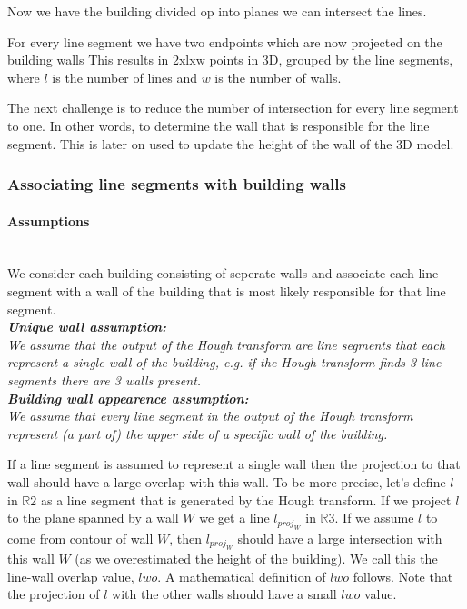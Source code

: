 	Now we have the building divided op into planes we can intersect the lines.

	For every line segment we have two endpoints which are now projected on the
	building walls
	This results in 2xlxw points in 3D, grouped by the line segments, where $l$ is the number
	of lines and $w$ is the number of walls. 

	The next challenge is to reduce the number of intersection for every line
	segment to one. In other words, to determine the wall that is responsible for
	the line segment. This is later on used to update the height of the wall of the
	3D model.


\subsubsection{Associating line segments with building walls}
	\paragraph{Assumptions}\\
	We consider each building consisting of seperate walls and associate each
	line segment with a wall of the building that is most likely responsible for
	that line segment. \\
		
	\textbf{	\emph{Unique wall assumption:}}\\
	\emph{We assume that the output of the Hough transform are line segments
	that each represent a single wall of the building, e.g. if the Hough
	transform finds 3 line segments there are 3 walls present.}\\

	\textbf{	\emph{Building wall appearence assumption:}}\\
	\emph{We assume that every line segment in the output of the Hough transform represent (a part of) the upper side of
	a specific wall of the building.}

	If a line segment is assumed to represent a single wall then the projection
	to that wall should have a large overlap with this wall.  To be more
	precise, let's define $l$ in $\mathbb{R}2$ as a line segment that is
	generated by the Hough transform.  If we project $l$ to the plane spanned
	by a wall $W$ we get a line $l_{proj_W}$ in $\mathbb{R}3$.  If we assume
	$l$ to come from contour of wall $W$, then $l_{proj_W}$ should have a large
	intersection with this wall $W$ (as we overestimated the height of the
	building). We call this the line-wall overlap value, $lwo$.  A mathematical
	definition of $lwo$ follows.  Note that the projection of $l$ with the
	other walls should have a small $lwo$ value.

